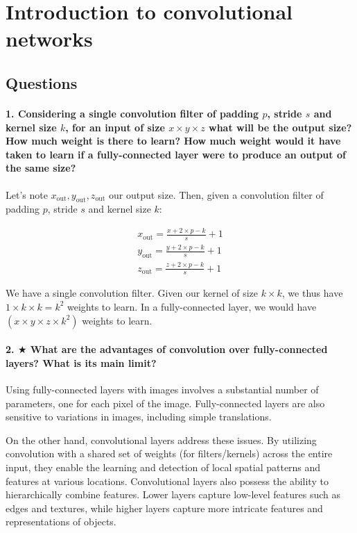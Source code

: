 \documentclass{article}
\theoremstyle{plain}%
\theoremstyle{definition}
\theoremstyle{remark}
\begin{document}
\newpage
\section{Introduction to convolutional networks}
\subsection{Questions}
\paragraph{1. Considering a single convolution filter of padding $p$, stride $s$ and kernel size $k$, for an input of size $x \times y \times z$ what will be the output size?
    How much weight is there to learn?
    How much weight would it have taken to learn if a fully-connected layer were to produce an output of the same size?}
Let's note $x_{\text{out}}, y_{\text{out}}, z_{\text{out}}$ our output size. Then, given a convolution filter of padding $p$, stride $s$ and kernel size $k$:

\begin{align}
    \label{eq:1} x_{\text{out}} = \frac{x + 2 \times p - k}{s} + 1 \\
    \label{eq:2} y_{\text{out}} = \frac{y + 2 \times p - k}{s} + 1 \\
    \label{eq:3} z_{\text{out}} = \frac{z + 2 \times p - k}{s} + 1
\end{align}

We have a single convolution filter. Given our kernel of size $ k \times k $, we thus have $ 1 \times k \times k = k^2 $ weights to learn. In a fully-connected layer, we would have $(x \times y \times z \times k^2)$ weights to learn.

\paragraph{2. $ \bigstar $ What are the advantages of convolution over fully-connected layers? What is its main limit?}
Using fully-connected layers with images involves a substantial number of parameters, one for each pixel of the image. Fully-connected layers are also sensitive to variations in images, including simple translations.

On the other hand, convolutional layers address these issues. By utilizing convolution with a shared set of weights (for filters/kernels) across the entire input, they enable the learning and detection of local spatial patterns and features at various locations. Convolutional layers also possess the ability to hierarchically combine features. Lower layers capture low-level features such as edges and textures, while higher layers capture more intricate features and representations of objects.
\end{document}
